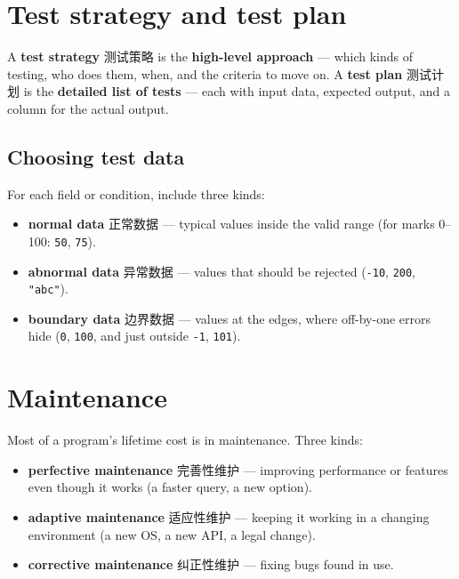\documentclass[11pt]{article}
\begin{document}
\section*{Test strategy and test plan}

A \textbf{test strategy} 测试策略 is the \textbf{high-level approach} — which kinds of testing, who does them, when, and the criteria to move on. A \textbf{test plan} 测试计划 is the \textbf{detailed list of tests} — each with input data, expected output, and a column for the actual output.

\subsection*{Choosing test data}

For each field or condition, include three kinds:

\begin{itemize}
\item \textbf{normal data} 正常数据 — typical values inside the valid range (for marks 0–100: \texttt{50}, \texttt{75}).

\item \textbf{abnormal data} 异常数据 — values that should be rejected (\texttt{-10}, \texttt{200}, \texttt{"abc"}).

\item \textbf{boundary data} 边界数据 — values at the edges, where off-by-one errors hide (\texttt{0}, \texttt{100}, and just outside \texttt{-1}, \texttt{101}).

\end{itemize}

\section*{Maintenance}

Most of a program's lifetime cost is in maintenance. Three kinds:

\begin{itemize}
\item \textbf{perfective maintenance} 完善性维护 — improving performance or features even though it works (a faster query, a new option).

\item \textbf{adaptive maintenance} 适应性维护 — keeping it working in a changing environment (a new OS, a new API, a legal change).

\item \textbf{corrective maintenance} 纠正性维护 — fixing bugs found in use.

\end{itemize}
\end{document}

